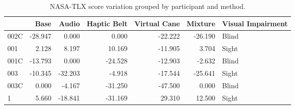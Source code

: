 
\begin{table}[!htb]
\centering
\caption{NASA-TLX score variation grouped by participant and method.}
\label{tab:nasa_var}
\begin{tabular}{lrrrrrl}
\toprule
{} &    Base &   Audio &  Haptic Belt &  Virtual Cane &  Mixture & Visual Impairment \\
\midrule
002C & -28.947 &   0.000 &        0.000 &       -22.222 &  -26.190 &             Blind \\
001  &   2.128 &   8.197 &       10.169 &       -11.905 &    3.704 &             Sight \\
001C & -13.793 &   0.000 &      -24.528 &       -12.903 &   -2.632 &             Blind \\
003  & -10.345 & -32.203 &       -4.918 &       -17.544 &  -25.641 &             Sight \\
003C &   0.000 &  -4.167 &      -31.250 &       -47.500 &    0.000 &             Blind \\
1    &   5.660 & -18.841 &      -31.169 &        29.310 &   12.500 &             Sight \\
\bottomrule
\end{tabular}
\end{table}

